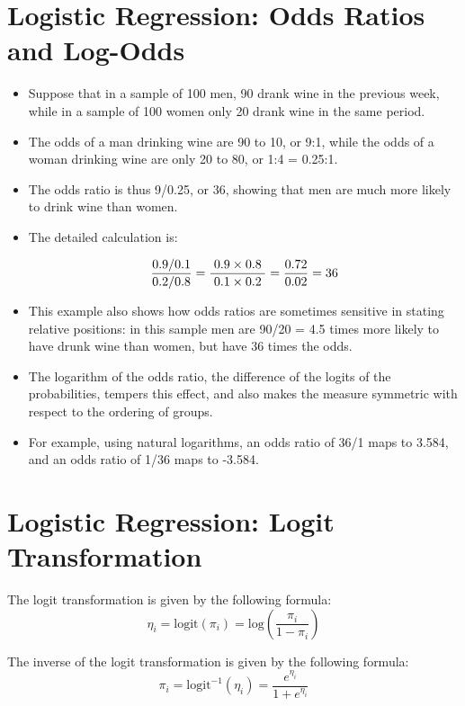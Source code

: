 \documentclass[a4paper,12pt]{article}
\begin{document}


\section{Logistic Regression: Odds Ratios and Log-Odds}
\begin{itemize}
	\item Suppose that in a sample of 100 men, 90 drank wine in the previous week, while in a sample of 100 women only 20 drank wine in the same period. \item The odds of a man drinking wine are 90 to 10, or 9:1, while the odds of a woman drinking wine are only 20 to 80, or 1:4 = 0.25:1. 
	\item The odds ratio is thus 9/0.25, or 36, showing that men are much more likely to drink wine than women. 
	\item The detailed calculation is:
	
	
	\[ { 0.9/0.1 \over 0.2/0.8}=\frac{\;0.9\times 0.8\;}{\;0.1\times 0.2\;} ={0.72 \over 0.02} = 36 \]
	
	\item This example also shows how odds ratios are sometimes sensitive in stating relative positions: in this sample men are 90/20 = 4.5 times more likely to have drunk wine than women, but have 36 times the odds. 
	
	
	
	\item The logarithm of the odds ratio, the difference of the logits of the probabilities, tempers this effect, and also makes the measure symmetric with respect to the ordering of groups. 
	\item For example, using natural logarithms, an odds ratio of 36/1 maps to 3.584, and an odds ratio of 1/36 maps to -3.584.
\end{itemize}


\section*{Logistic Regression: Logit Transformation}

The logit transformation is given by the following formula: 
\[ \eta_i = \mbox{logit}(\pi_i)  = \mbox{log}\left( \frac{\pi_i}{1- \pi_i} \right) \]

\noindent 
The inverse of the logit transformation is given by the following formula: 
\[ \pi_i = \mbox{logit}^{-1}(\eta_i)  =  \frac{e^{\eta_i}}{1 + e^{\eta_i}} \]
\end{document}
